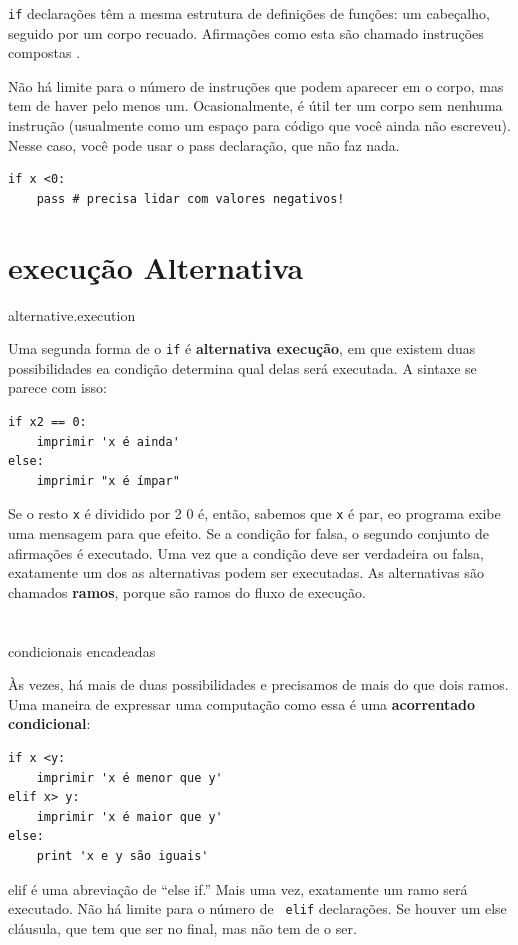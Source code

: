 \documentclass[10pt]{book}
\begin{document}
\begin{exercise}
{{\tt if} declarações têm a mesma estrutura de definições de funções:
um cabeçalho, seguido por um corpo recuado. Afirmações como esta são
chamado {instruções compostas \bf}.

Não há limite para o número de instruções que podem aparecer em
o corpo, mas tem de haver pelo menos um.
Ocasionalmente, é útil ter um corpo sem nenhuma instrução (usualmente
como um espaço para código que você ainda não escreveu). Nesse
caso, você pode usar o {pass \tt} declaração, que não faz nada.

\begin{verbatim}
if x <0:
    pass # precisa lidar com valores negativos!
\end{verbatim}
%

\section{execução Alternativa}
\label{} alternative.execution

Uma segunda forma de o {\tt if} é {\bf alternativa execução},
em que existem duas possibilidades ea condição determina
qual delas será executada. A sintaxe se parece com isso:

\begin{verbatim}
if x2 == 0:
    imprimir 'x é ainda'
else:
    imprimir "x é ímpar"
\end{verbatim}
%
Se o resto {\tt x} é dividido por 2 0 é, então,
sabemos que {\tt x} é par, eo programa exibe uma mensagem para que
efeito. Se a condição for falsa, o segundo conjunto de afirmações é
executado. Uma vez que a condição deve ser verdadeira ou falsa, exatamente um dos
as alternativas podem ser executadas. As alternativas são chamados
{\bf ramos}, porque são ramos do fluxo de execução.



\section{} condicionais encadeadas

Às vezes, há mais de duas possibilidades e precisamos de mais do que
dois ramos. Uma maneira de expressar uma computação como essa é uma {\bf
acorrentado condicional}:

\begin{verbatim}
if x <y:
    imprimir 'x é menor que y'
elif x> y:
    imprimir 'x é maior que y'
else:
    print 'x e y são iguais'
\end{verbatim}
%
{\tt} elif é uma abreviação de ``else if.'' Mais uma vez, exatamente um
ramo será executado. Não há limite para o número de {\tt
elif} declarações. Se houver um {\tt} else cláusula, que tem que ser
no final, mas não tem de o ser.


}
\end{exercise}
\end{document}
